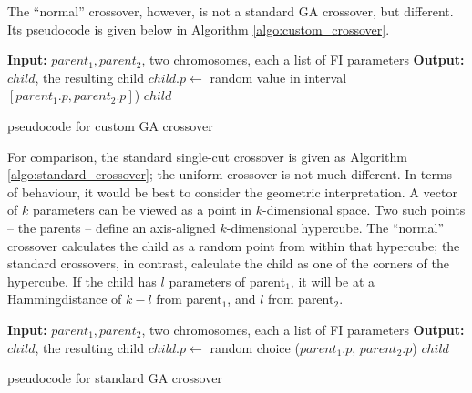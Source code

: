 \documentclass[times, utf8, diplomski]{fer}
\begin{document}
The ``normal'' crossover, however, is not a standard GA crossover, but different.
Its pseudocode is given below in Algorithm \ref{algo:custom_crossover}.

\begin{algorithm}
    \small
    \begin{algorithmic}
        \STATE \textbf{Input:} $parent_1, parent_2$, two chromosomes, each a list of FI parameters
        \STATE \textbf{Output:} $child$, the resulting child
            \STATE $child.p \gets $ random value in interval $[parent_1.p, parent_2.p]$)
        \ENDFOR
        \RETURN $child$
    \end{algorithmic}
    \caption{pseudocode for custom GA crossover}
    \label{algo:custom_crossover}
\end{algorithm}

For comparison, the standard single-cut crossover is given as Algorithm
\ref{algo:standard_crossover}; the uniform crossover is not much different.
In terms of behaviour, it would be best to consider the geometric interpretation.
A vector of $k$ parameters can be viewed as a point in $k$-dimensional space.
Two such points -- the parents -- define an axis-aligned $k$-dimensional hypercube.
The ``normal'' crossover calculates the child as a random point from within
that hypercube; the standard crossovers, in contrast, calculate the child as
one of the corners of the hypercube. If the child has $l$ parameters of parent$_1$,
it will be at a Hamming\footnotemark distance of $k-l$ from parent$_1$, and $l$
from parent$_2$.



\begin{algorithm}
    \small
    \begin{algorithmic}
        \STATE \textbf{Input:} $parent_1, parent_2$, two chromosomes, each a list of FI parameters
        \STATE \textbf{Output:} $child$, the resulting child
            \STATE $child.p \gets $ random choice ($parent_1.p$, $parent_2.p$)
        \ENDFOR
        \RETURN $child$
    \end{algorithmic}
    \caption{pseudocode for standard GA crossover}
    \label{algo:standard_crossover}
\end{algorithm}
\end{document}
